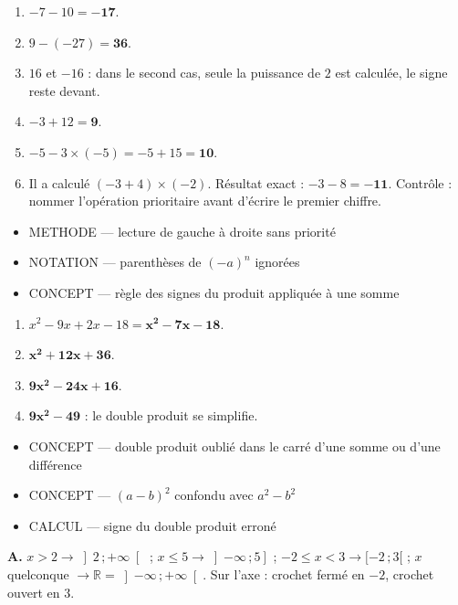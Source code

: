 \documentclass[10pt,a4paper]{article}
\begin{document}
\begin{enumerate}
\item $-7-10=\mathbf{-17}$.
\item $9 - (-27) = \mathbf{36}$.
\item $16$ et $-16$ : dans le second cas, seule la puissance de $2$ est calculée, le signe reste devant.
\item $-3 + 12 = \mathbf{9}$.
\item $-5 - 3\times(-5) = -5 + 15 = \mathbf{10}$.
\item Il a calculé $(-3+4)\times(-2)$. Résultat exact : $-3-8=\mathbf{-11}$. Contrôle : nommer l'opération prioritaire avant d'écrire le premier chiffre.
\end{enumerate}
\begin{itemize}
\item \textsc{METHODE} --- lecture de gauche à droite sans priorité
\item \textsc{NOTATION} --- parenthèses de $(-a)^n$ ignorées
\item \textsc{CONCEPT} --- règle des signes du produit appliquée à une somme
\end{itemize}
\begin{enumerate}
\item $x^2-9x+2x-18=\mathbf{x^2-7x-18}$.
\item $\mathbf{x^2+12x+36}$.
\item $\mathbf{9x^2-24x+16}$.
\item $\mathbf{9x^2-49}$ : le double produit se simplifie.
\end{enumerate}
\begin{itemize}
\item \textsc{CONCEPT} --- double produit oublié dans le carré d'une somme ou d'une différence
\item \textsc{CONCEPT} --- $(a-b)^2$ confondu avec $a^2-b^2$
\item \textsc{CALCUL} --- signe du double produit erroné
\end{itemize}

\textbf{A.} $x>2 \to \left]2\,;+\infty\right[$ ; $x\le 5 \to \left]-\infty\,;5\right]$ ;
$-2\le x<3 \to [-2\,;3[$ ; $x$ quelconque $\to \mathbb{R}=\left]-\infty\,;+\infty\right[$.
Sur l'axe : crochet fermé en $-2$, crochet ouvert en $3$.
\end{document}
